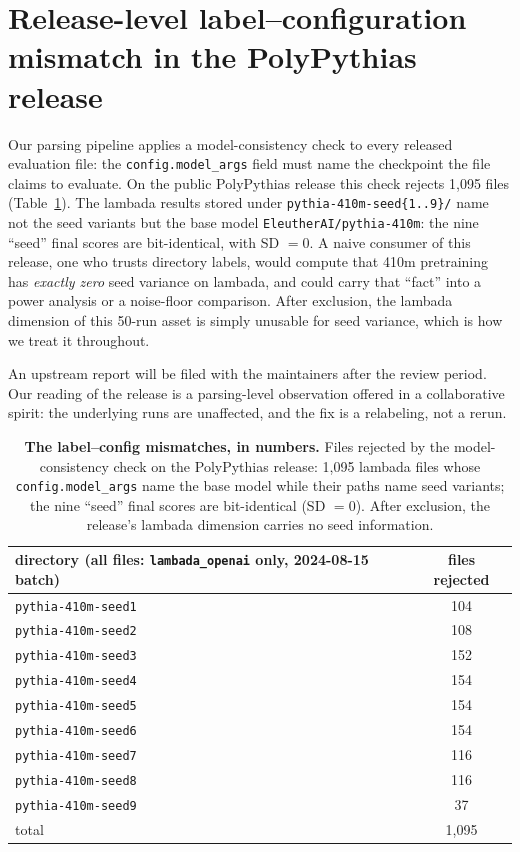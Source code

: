 
\section{Release-level label--configuration mismatch in the PolyPythias release}
\label{app:case}

Our parsing pipeline applies a model-consistency check to every released evaluation file: the
\texttt{config.model\_args} field must name the checkpoint the file claims to evaluate. On the
public PolyPythias release this check rejects 1{,}095 files (Table~\ref{tab:bug}). The lambada results stored under
\texttt{pythia-410m-seed\{1..9\}/} name not the seed variants but the base model
\texttt{EleutherAI/pythia-410m}: the nine ``seed'' final scores are bit-identical, with SD $= 0$.
A naive consumer of this release, one who trusts directory labels, would compute that 410m
pretraining has \emph{exactly zero} seed variance on lambada, and could carry that ``fact'' into
a power analysis or a noise-floor comparison. After exclusion, the lambada dimension of this
50-run asset is simply unusable for seed variance, which is how we treat it throughout.

An upstream report will be filed with the maintainers after the review period.
Our reading
of the release is a
parsing-level observation offered in a collaborative spirit: the underlying runs are unaffected,
and the fix is a relabeling, not a rerun.

\begin{table}[!htbp]
\centering
\caption{\textbf{The label--config mismatches, in numbers.} Files rejected by the model-consistency
check on the PolyPythias release: 1{,}095 lambada files whose \texttt{config.model\_args} name
the base model while their paths name seed variants; the nine ``seed'' final scores are
bit-identical (SD $= 0$). After exclusion, the release's lambada dimension carries no seed
information.}
\label{tab:bug}
\footnotesize
\begin{tabular}{@{}lc@{}}
\toprule
directory (all files: \texttt{lambada\_openai} only, 2024-08-15 batch) & files rejected \\
\midrule
\texttt{pythia-410m-seed1} & 104 \\
\texttt{pythia-410m-seed2} & 108 \\
\texttt{pythia-410m-seed3} & 152 \\
\texttt{pythia-410m-seed4} & 154 \\
\texttt{pythia-410m-seed5} & 154 \\
\texttt{pythia-410m-seed6} & 154 \\
\texttt{pythia-410m-seed7} & 116 \\
\texttt{pythia-410m-seed8} & 116 \\
\texttt{pythia-410m-seed9} & 37 \\
\midrule
total & 1{,}095 \\
\bottomrule
\end{tabular}
\end{table}

\FloatBarrier
